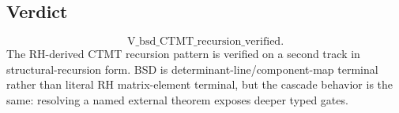 \documentclass[11pt]{article}
\begin{document}
\subsection*{Verdict}

\[
\boxed{\mathrm{V\_bsd\_CTMT\_recursion\_verified}}.
\]
The RH-derived CTMT recursion pattern is verified on a second track in structural-recursion form.  BSD is determinant-line/component-map terminal rather than literal RH matrix-element terminal, but the cascade behavior is the same: resolving a named external theorem exposes deeper typed gates.
\end{document}
